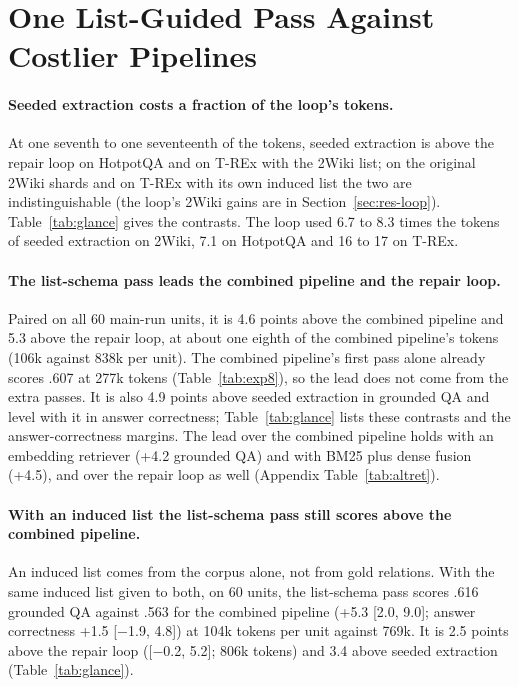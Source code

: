 \section{One List-Guided Pass Against Costlier Pipelines}
\label{sec:res-cost}

\paragraph{Seeded extraction costs a fraction of the loop's tokens.}
At one seventh to one seventeenth of the tokens, seeded extraction is above the repair loop on HotpotQA and on T-REx with the 2Wiki list; on the original 2Wiki shards and on T-REx with its own induced list the two are indistinguishable (the loop's 2Wiki gains are in Section~\ref{sec:res-loop}). Table~\ref{tab:glance} gives the contrasts. The loop used 6.7 to 8.3 times the tokens of seeded extraction on 2Wiki, 7.1 on HotpotQA and 16 to 17 on T-REx.

\paragraph{The list-schema pass leads the combined pipeline and the repair loop.}
Paired on all 60 main-run units, it is 4.6 points above the combined pipeline and 5.3 above the repair loop, at about one eighth of the combined pipeline's tokens (106k against 838k per unit). The combined pipeline's first pass alone already scores .607 at 277k tokens (Table~\ref{tab:exp8}), so the lead does not come from the extra passes. It is also 4.9 points above seeded extraction in grounded QA and level with it in answer correctness; Table~\ref{tab:glance} lists these contrasts and the answer-correctness margins. The lead over the combined pipeline holds with an embedding retriever (+4.2 grounded QA) and with BM25 plus dense fusion (+4.5), and over the repair loop as well (Appendix Table~\ref{tab:altret}).

\paragraph{With an induced list the list-schema pass still scores above the combined pipeline.}
An induced list comes from the corpus alone, not from gold relations. With the same induced list given to both, on 60 units, the list-schema pass scores .616 grounded QA against .563 for the combined pipeline (+5.3 [2.0, 9.0]; answer correctness +1.5 [$-$1.9, 4.8]) at 104k tokens per unit against 769k. It is 2.5 points above the repair loop ([$-$0.2, 5.2]; 806k tokens) and 3.4 above seeded extraction (Table~\ref{tab:glance}).

